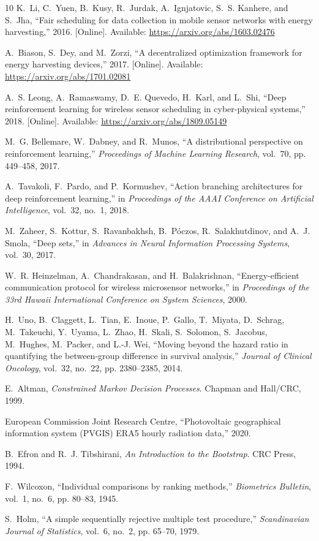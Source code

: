 \documentclass[journal]{IEEEtran}
\begin{document}
\begin{thebibliography}{10}
K.~Li, C.~Yuen, B.~Kusy, R.~Jurdak, A.~Ignjatovic, S.~S. Kanhere, and S.~Jha,
  ``Fair scheduling for data collection in mobile sensor networks with energy
  harvesting,'' 2016. [Online]. Available:
  \url{https://arxiv.org/abs/1603.02476}

A.~Biason, S.~Dey, and M.~Zorzi, ``A decentralized optimization framework for
  energy harvesting devices,'' 2017. [Online]. Available:
  \url{https://arxiv.org/abs/1701.02081}

A.~S. Leong, A.~Ramaswamy, D.~E. Quevedo, H.~Karl, and L.~Shi, ``Deep
  reinforcement learning for wireless sensor scheduling in cyber-physical
  systems,'' 2018. [Online]. Available: \url{https://arxiv.org/abs/1809.05149}

M.~G. Bellemare, W.~Dabney, and R.~Munos, ``A distributional perspective on
  reinforcement learning,'' \emph{Proceedings of Machine Learning Research},
  vol.~70, pp. 449--458, 2017.

A.~Tavakoli, F.~Pardo, and P.~Kormushev, ``Action branching architectures for
  deep reinforcement learning,'' in \emph{Proceedings of the AAAI Conference on
  Artificial Intelligence}, vol.~32, no.~1, 2018.

M.~Zaheer, S.~Kottur, S.~Ravanbakhsh, B.~P{\'o}czos, R.~Salakhutdinov, and
  A.~J. Smola, ``Deep sets,'' in \emph{Advances in Neural Information
  Processing Systems}, vol.~30, 2017.

W.~R. Heinzelman, A.~Chandrakasan, and H.~Balakrishnan, ``Energy-efficient
  communication protocol for wireless microsensor networks,'' in
  \emph{Proceedings of the 33rd Hawaii International Conference on System
  Sciences}, 2000.

H.~Uno, B.~Claggett, L.~Tian, E.~Inoue, P.~Gallo, T.~Miyata, D.~Schrag,
  M.~Takeuchi, Y.~Uyama, L.~Zhao, H.~Skali, S.~Solomon, S.~Jacobus, M.~Hughes,
  M.~Packer, and L.-J. Wei, ``Moving beyond the hazard ratio in quantifying the
  between-group difference in survival analysis,'' \emph{Journal of Clinical
  Oncology}, vol.~32, no.~22, pp. 2380--2385, 2014.

E.~Altman, \emph{Constrained Markov Decision Processes}. Chapman and Hall/CRC,
  1999.

{European Commission Joint Research Centre}, ``Photovoltaic geographical
  information system (PVGIS) ERA5 hourly radiation data,'' 2020.

B.~Efron and R.~J. Tibshirani, \emph{An Introduction to the Bootstrap}.
  CRC Press, 1994.

F.~Wilcoxon, ``Individual comparisons by ranking methods,'' \emph{Biometrics
  Bulletin}, vol.~1, no.~6, pp. 80--83, 1945.

S.~Holm, ``A simple sequentially rejective multiple test procedure,''
  \emph{Scandinavian Journal of Statistics}, vol.~6, no.~2, pp. 65--70, 1979.

\end{thebibliography}
\end{document}
